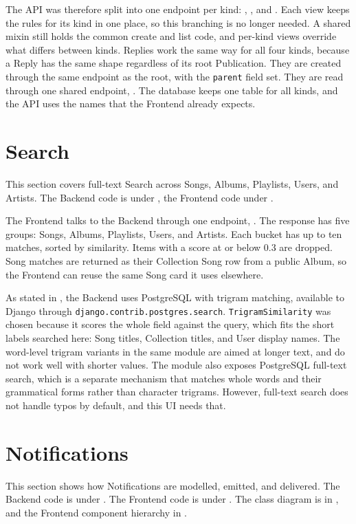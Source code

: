 The API was therefore split into one endpoint per kind:
,
,
and .
Each view keeps the rules for its kind in one place,
so this branching is no longer needed. A shared mixin still holds the common create and list
code, and per-kind views override what differs between kinds.
Replies work the same way for all four kinds,
because a Reply has the same shape regardless of its root Publication.
They are created through the same endpoint as the root, with the
\texttt{parent} field set. They are read through one shared endpoint,
. The database keeps one table for
all kinds, and the API uses the names that the Frontend already
expects.


\section{Search}\label{sec:search}
This section covers full-text Search across Songs, Albums, Playlists,
Users, and Artists. The Backend code is under
, the Frontend code under
.

The Frontend talks to the Backend through one endpoint,
. The response has five groups: Songs,
Albums, Playlists, Users, and Artists. Each bucket has up to ten
matches, sorted by similarity. Items with a score at or below 0.3 are
dropped. Song matches are returned as their Collection Song row from a
public Album, so the Frontend can reuse the same Song card it uses
elsewhere.

As stated in , the Backend uses PostgreSQL
with trigram matching, available to Django through
\texttt{django.\-contrib.\-postgres.\-search}.
\texttt{TrigramSimilarity} was chosen because it scores the whole
field against the query, which fits the short labels searched here:
Song titles, Collection titles, and User display names. The
word-level trigram variants in the same module are aimed at longer
text, and do not work well with shorter values. The module also
exposes PostgreSQL full-text search, which is a separate mechanism
that matches whole words and their grammatical forms rather than
character trigrams. However, full-text search does not handle typos
by default, and this UI needs that.


\section{Notifications}\label{sec:notifications}
This section shows how Notifications are modelled, emitted, and delivered.
The Backend code is under .
The Frontend code is under
.
The class diagram is in
,
and the Frontend component hierarchy in
.

